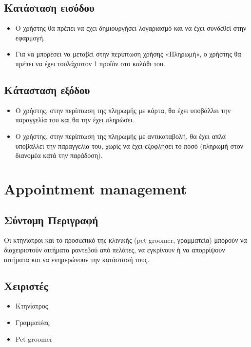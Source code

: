 \documentclass[12pt,a4paper,twoside]{book}
\begin{document}
\subsection{Κατάσταση εισόδου} %
\begin{itemize}
  \item Ο χρήστης θα πρέπει να έχει δημιουργήσει λογαριασμό και να έχει συνδεθεί στην εφαρμογή. %
  \item Για να μπορέσει να μεταβεί στην περίπτωση χρήσης «Πληρωμή», ο χρήστης θα πρέπει να έχει τουλάχιστον 1 προϊόν στο καλάθι του.
\end{itemize}

\subsection{Κάτασταση εξόδου} %
\begin{itemize}
  \item	Ο χρήστης, στην περίπτωση της πληρωμής με κάρτα, θα έχει υποβάλλει την παραγγελία του και θα την έχει πληρώσει. %
  \item Ο χρήστης, στην περίπτωση της πληρωμής με αντικαταβολή, θα έχει απλά υποβάλλει την παραγγελία του, χωρίς να έχει εξοφλήσει το ποσό (πληρωμή στον διανομέα κατά την παράδοση).
\end{itemize}

\section{Appointment management}

\subsection{Σύντομη Περιγραφή}
Οι κτηνίατροι και το προσωπικό της κλινικής (pet groomer, γραμματεία) μπορούν να διαχειριστούν αιτήματα ραντεβού από πελάτες, να εγκρίνουν ή να απορρίψουν αιτήματα και να ενημερώνουν την κατάστασή τους. %

\subsection{Χειριστές}
\begin{itemize}
  \item Κτηνίατρος
  \item Γραμματέας
  \item Pet groomer
\end{itemize}
\end{document}
